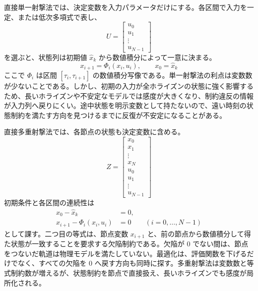 直接単一射撃法では、決定変数を入力パラメータだけにする。各区間で入力を一定、または低次多項式で表し、
\begin{equation}
  U=
  \begin{bmatrix}
    u_0\\u_1\\\vdots\\u_{N-1}
  \end{bmatrix}
\end{equation}
を選ぶと、状態列は初期値 $\hat{x}_k$ から数値積分によって一意に決まる。
\begin{equation}
  x_{i+1}=\Phi_i(x_i,u_i),
  \qquad
  x_0=\hat{x}_k
\end{equation}
ここで $\Phi_i$ は区間 $[\tau_i,\tau_{i+1}]$ の数値積分写像である。単一射撃法の利点は変数数が少ないことである。しかし、初期の入力が全ホライズンの状態に強く影響するため、長いホライズンや不安定なモデルでは感度が大きくなり、制約違反の情報が入力列へ戻りにくい。途中状態を明示変数として持たないので、遠い時刻の状態制約を満たす方向を見つけるまでに反復が不安定になることがある。

直接多重射撃法では、各節点の状態も決定変数に含める。
\begin{equation}
  Z=
  \begin{bmatrix}
    x_0\\x_1\\\vdots\\x_N\\u_0\\u_1\\\vdots\\u_{N-1}
  \end{bmatrix}
\end{equation}
初期条件と各区間の連続性は
\begin{align}
  x_0-\hat{x}_k&=0,\\
  x_{i+1}-\Phi_i(x_i,u_i)&=0
  \qquad (i=0,\ldots,N-1)
\end{align}
として課す。二つ目の等式は、節点変数 $x_{i+1}$ と、前の節点から数値積分して得た状態が一致することを要求する欠陥制約である。欠陥が 0 でない間は、節点をつないだ軌道は物理モデルを満たしていない。最適化は、評価関数を下げるだけでなく、すべての欠陥を 0 へ戻す方向も同時に探す。多重射撃法は変数数と等式制約数が増えるが、状態制約を節点で直接扱え、長いホライズンでも感度が局所化される。

